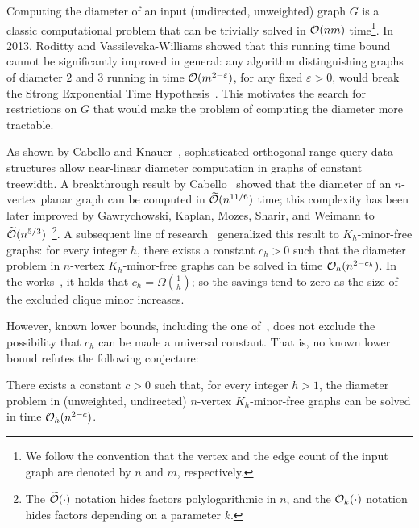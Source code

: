 
Computing the diameter of an input (undirected, unweighted) graph $G$ is a classic computational 
problem that can be trivially solved in $\mathcal{O}(nm)$ time\footnote{We follow the convention that the vertex and the edge count of the input graph are denoted by $n$ and $m$, respectively.}.
In 2013, Roditty and Vassilevska-Williams showed that this running
time bound cannot be significantly improved in general:
any algorithm distinguishing graphs of diameter $2$ and $3$
running in time $\mathcal{O}(m^{2-\varepsilon})$, for any fixed $\varepsilon > 0$,
would break the Strong Exponential Time Hypothesis~\cite{RodittyW13}. 
This motivates the search for restrictions on $G$ that would make the  problem of computing the diameter more tractable.

As shown by Cabello and Knauer~\cite{CabelloK09}, sophisticated orthogonal range query data structures allow near-linear diameter
computation in graphs of constant treewidth.
A breakthrough result by Cabello~\cite{Cabello19} showed that 
the diameter of an $n$-vertex planar graph can be computed in $\widetilde{\mathcal{O}}(n^{11/6})$ time;
this complexity has been later improved by Gawrychowski, Kaplan, Mozes, Sharir, and Weimann to
$\widetilde{\mathcal{O}}(n^{5/3})$~\cite{GawrychowskiKMS21}\footnote{The $\widetilde{\mathcal{O}}(\cdot)$ notation hides factors polylogarithmic in $n$, and the $\mathcal{O}_k(\cdot)$ notation hides factors depending on a parameter $k$.}.
A subsequent line of research~\cite{DucoffeHV22,DurajKP23,LeW24}
generalized this result to $K_h$-minor-free graphs:
for every integer $h$, there exists a constant $c_h > 0$ such that the diameter
problem in $n$-vertex $K_h$-minor-free graphs can be solved in time $\mathcal{O}_h(n^{2-c_h})$. 
In the works~\cite{DurajKP23,LeW24}, it holds that $c_h = \Omega\left(\frac{1}{h}\right)$; so the savings tend to zero as the size of the excluded clique minor increases.

However, known lower bounds, including the one of~\cite{RodittyW13}, does not exclude the possibility
that $c_h$ can be made a universal constant. That is, no known lower bound refutes
the following conjecture:
\begin{conjecture}\label{conj:taunt}
There exists a constant $c > 0$ such that,
for every integer $h > 1$, the diameter problem in (unweighted, undirected) $n$-vertex
$K_h$-minor-free graphs can be solved in time $\mathcal{O}_h(n^{2-c})$. 
\end{conjecture}

